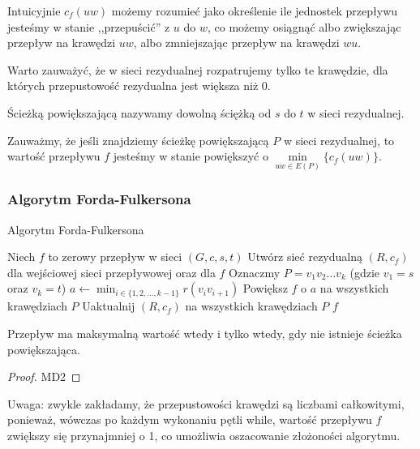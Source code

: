 Intuicyjnie $c_f(uw)$ możemy
rozumieć jako określenie ile jednostek przepływu 
jesteśmy w stanie ,,przepuścić'' z $u$ do $w$, co
możemy osiągnąć albo zwiększając przepływ na krawędzi $uw$,
albo zmniejszając przepływ na krawędzi $wu$.

Warto zauważyć, że w sieci rezydualnej rozpatrujemy tylko te 
krawędzie, dla których przepustowość rezydualna jest większa niż 0.

\begin{defi}
	Ścieżką powiększającą nazywamy dowolną ściężką od $s$
	do $t$ w sieci rezydualnej. 
\end{defi}

Zauważmy, że jeśli znajdziemy ścieżkę powiększającą $P$ 
w sieci rezydualnej,
to wartość przepływu $f$ jesteśmy w stanie powiększyć o 
$\min\limits_{uw \in E(P)} \{c_f(uw)\}$.

\subsubsection{Algorytm Forda-Fulkersona}

\begin{algorithm}[H]
	\caption{Algorytm Forda-Fulkersona}\label{alg:ford-fulker}
	\begin{algorithmic}[1]
		\State Niech $f$ to zerowy przepływ w sieci $(G,c,s,t)$
		\State Utwórz sieć rezydualną $(R, c_f)$ dla wejściowej 
		sieci przepływowej oraz dla $f$ 
		\State Oznaczmy $P = v_1v_2\dots v_k$ (gdzie $v_1 = s$ oraz $v_k = t$)
		\State $a \gets \min_{i \in \{1, 2, \dots, k-1\}} r(v_iv_{i+1})$
		\State Powiększ $f$ o $a$ na wszystkich krawędziach $P$
		\State Uaktualnij $(R, c_f)$ na wszystkich krawędziach $P$
		\EndWhile
		\State \Return $f$
		\EndProcedure
	\end{algorithmic}
\end{algorithm}

\begin{theorem}
	 Przepływ ma maksymalną wartość wtedy i tylko 
	wtedy, gdy nie istnieje ścieżka powiększająca.
	\begin{proof}
		MD2
	\end{proof}
\end{theorem}

Uwaga: zwykle 
zakładamy, że przepustowości krawędzi są liczbami całkowitymi, 
ponieważ, wówczas po każdym 
wykonaniu pętli while, wartość przepływu $f$ zwiększy się
przynajmniej o 1, co umożliwia oszacowanie
złożoności algorytmu. 


